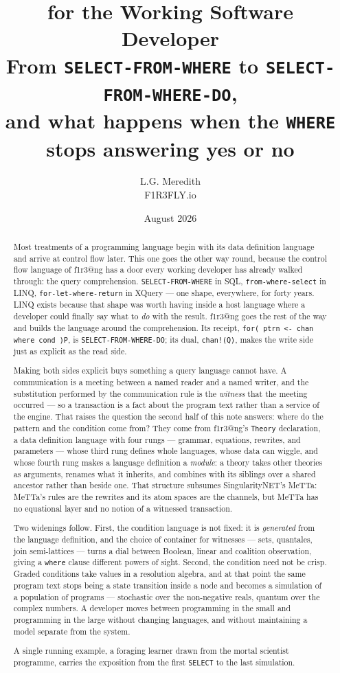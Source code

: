 \documentclass[11pt]{article}
\title{\bf \flangbf{} for the Working Software Developer\\[2mm]
\large From \texttt{SELECT-FROM-WHERE} to \texttt{SELECT-FROM-WHERE-DO},\\
\large and what happens when the \texttt{WHERE} stops answering yes or no}
\author{L.G. Meredith\\ \small F1R3FLY.io}
\date{August 2026}
\makeatletter
\theoremstyle{definition}
\theoremstyle{plain}
\theoremstyle{remark}
\newcommand{\flang}{\textsf{f1r3\textbar @ng}}
\makeatother
\begin{document}
\maketitle

\begin{abstract}
\noindent
Most treatments of a programming language begin with its data definition language
and arrive at control flow later. This one goes the other way round, because the
control flow language of \flang{} has a door every working developer has
already walked through: the query comprehension. \texttt{SELECT-FROM-WHERE} in SQL,
\texttt{from-where-select} in LINQ, \texttt{for-let-where-return} in XQuery --- one
shape, everywhere, for forty years. LINQ exists because that shape was worth
having inside a host language where a developer could finally say what to
\emph{do} with the result. \flang{} goes the rest of the way and builds the
language around the comprehension. Its receipt,
\texttt{for( ptrn <- chan where cond )P}, is \texttt{SELECT-FROM-WHERE-DO}; its
dual, \texttt{chan!(Q)}, makes the write side just as explicit as the read
side.

Making both sides explicit buys something a query language cannot have. A
communication is a meeting between a named reader and a named writer, and the
substitution performed by the communication rule is the \emph{witness} that the
meeting occurred --- so a transaction is a fact about the program text rather
than a service of the engine. That raises the question the second half of this
note answers: where do the pattern and the condition come from? They come from
\flang{}'s \texttt{Theory} declaration, a data definition language with four
rungs --- grammar, equations, rewrites, and parameters --- whose third rung
defines whole languages, whose data can wiggle, and whose fourth rung makes a
language definition a \emph{module}: a theory takes other theories as arguments,
renames what it inherits, and combines with its siblings over a shared ancestor
rather than beside one. That structure subsumes SingularityNET's MeTTa: MeTTa's
rules are the rewrites and its atom spaces are the channels, but MeTTa has no
equational layer and no notion of a witnessed transaction.

Two widenings follow. First, the condition language is not fixed: it is
\emph{generated} from the language definition, and the choice of container for
witnesses --- sets, quantales, join semi-lattices --- turns a dial between
Boolean, linear and coalition observation, giving a \texttt{where} clause
different powers of sight. Second, the condition need not be crisp. Graded
conditions take values in a resolution algebra, and at that point the same
program text stops being a state transition inside a node and becomes a
simulation of a population of programs --- stochastic over the non-negative
reals, quantum over the complex numbers. A developer moves between programming
in the small and programming in the large without changing languages, and
without maintaining a model separate from the system.

A single running example, a foraging learner drawn from the mortal scientist
programme, carries the exposition from the first \texttt{SELECT} to the last
simulation.
\end{abstract}
\end{document}

